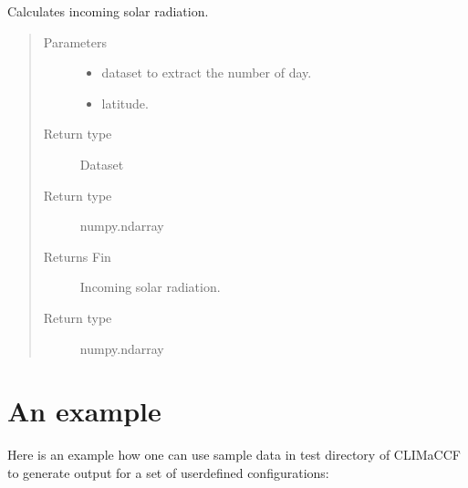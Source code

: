 \documentclass[a4paper,11pt,english]{sphinxmanual}
\begin{document}
\begin{fulllineitems}
\label{\detokenize{modules:envlib.accf.get_Fin}}
Calculates incoming solar radiation.
\begin{quote}\begin{description}
\item[{Parameters}] \leavevmode\begin{itemize}
\item {} 
 \textendash{} dataset to extract the number of day.

\item {} 
 \textendash{} latitude.

\end{itemize}

\item[{Return type}] \leavevmode
Dataset

\item[{Return type}] \leavevmode
numpy.ndarray

\item[{Returns Fin}] \leavevmode
Incoming solar radiation.

\item[{Return type}] \leavevmode
numpy.ndarray

\end{description}\end{quote}

\end{fulllineitems}



\chapter{An example}
\label{\detokenize{index:an-example}}
Here is an example how one can use sample data in test directory of CLIMaCCF to generate output for a set of user\sphinxhyphen{}defined configurations:
\end{document}
